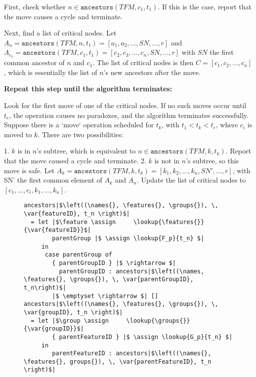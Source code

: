 First, check whether $n \in \texttt{ancestors}(TFM, c_1, t_1)$. If this is the case, report that the move causes a cycle and terminate. 

Next, find a list of critical nodes. 
Let $A_n = \texttt{ancestors}(TFM, n, t_1) = [a_1, a_2, \dots, SN, \dots, r]$ and $A_{c_1} = \texttt{ancestors}(TFM, c_1, t_1) = [c_2, c_3, \dots, c_n, SN, \dots, r]$ with $SN$ the first common ancestor of $n$ and $c_1$. The list of critical nodes is then $C = [c_1, c_2, \dots, c_n]$, which is essentially the list of $n$'s new ancestors after the move. 

\textbf{Repeat this step until the algorithm terminates:}

Look for the first move of one of the critical nodes. If no such moves occur until $t_e$, the operation causes no paradoxes, and the algorithm terminates successfully.  
  Suppose there is a `move` operation scheduled for $t_k$, with $t_1 < t_k < t_e$, where $c_i$ is moved to $k$. There are two possibilities:  

  1. $k$ is in $n$'s subtree, which is equivalent to $n \in \texttt{ancestors}(TFM, k, t_k)$. Report that the move caused a cycle and terminate. 
  2. $k$ is not in $n$'s subtree, so this move is safe. Let $A_k = \texttt{ancestors}(TFM, k, t_k) = [k_1, k_2, \dots, k_n, SN', \dots, r]$, with SN' the first common element of $A_k$ and $A_n$. Update the list of critical nodes to $[c_1, \dots, c_i, k_1, \dots, k_n]$.

\begin{figure}[h]
  \begin{verbatim}
ancestors|$\left((\names{}, \features{}, \groups{}), \, \var{featureID}, t_n \right)$| 
  = let |$\feature \assign     \lookup{\features{}}{\var{featureID}}$|
        parentGroup |$ \assign \lookup{F_p}{t_n} $|
     in 
      case parentGroup of
        { parentGroupID } |$ \rightarrow $| 
          parentGroupID : ancestors|$\left((\names, \features{}, \groups{}), \, \var{parentGroupID}, t_n\right)$|
        |$ \emptyset \rightarrow $| []
ancestors|$\left((\names{}, \features{}, \groups{}), \, \var{groupID}, t_n \right)$| 
  = let |$\group \assign     \lookup{\groups{}}{\var{groupID}}$|
        { parentFeatureID } |$ \assign \lookup{G_p}{t_n} $|
     in 
        parentFeatureID : ancestors|$\left((\names{}, \features{}, groups{}), \, \var{parentFeatureID}, t_n \right)$| 
  \end{verbatim}
  \caption{\label{fun:ancestors}}
\end{figure}

